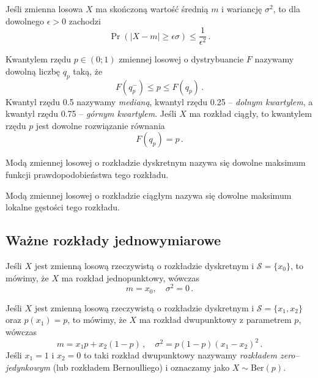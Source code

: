 \documentclass{myclass}
\numberwithin{equation}{subsection}
\begin{document}
\begin{theorem}
Jeśli zmienna losowa \(X\) ma skończoną wartość średnią \(m\) i wariancję \(\sigma^2\), to dla
dowolnego \(\epsilon > 0\) zachodzi
\begin{equation*}
    \Pr(|X - m| \geq \epsilon\sigma) \leq \frac{1}{\epsilon^2}\,.
\end{equation*}
\end{theorem}

\begin{definition}[Kwantyla]
Kwantylem rzędu \(p \in (0;1)\) zmiennej losowej o dystrybuancie \(F\) nazywamy dowolną liczbę
\(q_p\) taką, że
\begin{equation*}
    F(q_p^-) \leq p \leq F(q_p)\,.
\end{equation*}
Kwantyl rzędu 0.5 nazywamy \emph{medianą}, kwantyl rzędu 0.25 -- \emph{dolnym kwartylem}, a kwantyl
rzędu 0.75 -- \emph{górnym kwartylem}. Jeśli \(X\) ma rozkład ciągły, to kwantylem rzędu \(p\) jest
dowolne rozwiązanie równania
\begin{equation*}
    F(q_p) = p\,.
\end{equation*}
\end{definition}

\begin{definition}[Mody]
Modą zmiennej losowej o rozkładzie dyskretnym nazywa się dowolne maksimum funkcji prawdopodobieństwa
tego rozkładu.

Modą zmiennej losowej o rozkładzie ciągłym nazywa się dowolne maksimum lokalne gęstości tego
rozkładu.
\end{definition}


\subsection{Ważne rozkłady jednowymiarowe}

\begin{definition}
Jeśli \(X\) jest zmienną losową rzeczywistą o rozkładzie dyskretnym i \(\mathcal{S} = \{x_0\}\), to
mówimy, że \(X\) ma rozkład jednopunktowy, wówczas
\begin{equation*}
    m = x_0,\quad \sigma^2 = 0\,.
\end{equation*}
\end{definition}

\begin{definition}
Jeśli \(X\) jest zmienną losową rzeczywistą o rozkładzie dyskretnym i \(\mathcal{S} = \{x_1, x_2\}\)
oraz \(p(x_1) = p\), to mówimy, że \(X\) ma rozkład dwupunktowy z parametrem \(p\), wówczas
\begin{equation*}
    m = x_1 p + x_2 (1 - p)\,,\quad \sigma^2 = p (1 - p) (x_1 - x_2)^2\,.
\end{equation*}
Jeśli \(x_1 = 1\) i \(x_2 = 0\) to taki rozkład dwupunktowy nazywamy \emph{rozkładem
zero--jedynkowym} (lub rozkładem Bernoulliego) i oznaczamy jako \(X \sim \mathrm{Ber}(p)\).
\end{definition}
\end{document}
